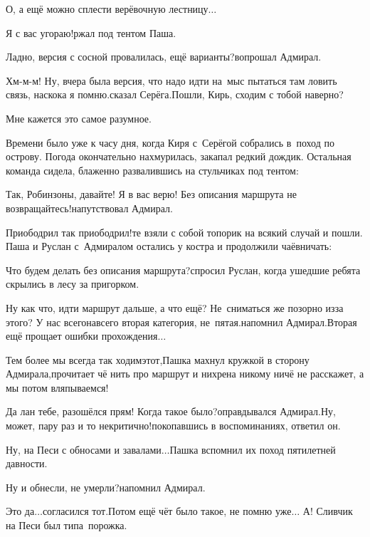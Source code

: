\diagdash О, а ещё можно сплести верёвочную лестницу$\ldots$

\diagdash Я с вас угораю!\mdash ржал под тентом Паша.

\diagdash Ладно, версия с сосной провалилась, ещё варианты?\mdash вопрошал Адмирал.

\diagdash Хм-м-м! Ну, вчера была версия, что надо идти на~мыс пытаться там ловить связь, наскока я помню.\mdash сказал Серёга.\mdash Пошли, Кирь, сходим с тобой наверно?

\diagdash Мне кажется это самое разумное.

Времени было уже к часу дня, когда Киря с~Серёгой собрались в~поход по острову. Погода окончательно нахмурилась, закапал редкий дождик. Остальная команда сидела, блаженно развалившись на стульчиках под тентом:

\diagdash Так, Робинзоны, давайте! Я в вас верю! Без описания маршрута не возвращайтесь!\mdash напутствовал Адмирал.

\diagdash Приободрил так приободрил!\mdash те взяли с собой топорик на всякий случай и пошли. Паша и Руслан с~Адмиралом остались у костра и продолжили чаёвничать:

\diagdash Что будем делать без описания маршрута?\mdash спросил Руслан, когда ушедшие ребята скрылись в лесу за пригорком.

\diagdash Ну как что, идти маршрут дальше, а что ещё? Не~сниматься же позорно из\sdash за этого? У нас всего\sdash навсего вторая категория, не~пятая.\mdash напомнил Адмирал.\mdash Вторая ещё прощает ошибки прохождения$\ldots$

\diagdash Тем более мы всегда так ходим\mdash этот,\mdash Пашка махнул кружкой в сторону Адмирала,\mdash прочитает чё нить про маршрут и нихрена никому ничё не расскажет, а мы потом вляпываемся!

\diagdash Да лан тебе, разошёлся прям! Когда такое было?\mdash оправдывался Адмирал.\mdash Ну, может, пару раз и то некритично!\mdash покопавшись в воспоминаниях, ответил он.

\diagdash Ну, на Песи с обносами и завалами$\ldots$\mdash Пашка вспомнил их поход пятилетней давности.

\diagdash Ну и обнесли, не умерли?\mdash напомнил Адмирал.

\diagdash Это да$\ldots$\mdash согласился тот.\mdash Потом ещё чёт было такое, не помню уже$\ldots$ А! Сливчик на Песи был типа~порожка.

